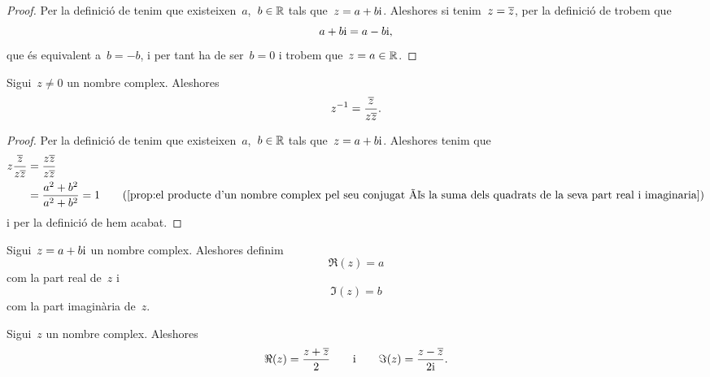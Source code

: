 \documentclass[../../main.tex]{subfiles}
\begin{document}
    \begin{proof}
        Per la definició de  tenim que
        existeixen~\(a\),~\(b\in\mathbb{R}\) tals que~\(z = a+b\mathrm{i}\).
        Aleshores si tenim~\(z = \overline{z}\), per la definició
        de  trobem que
        \[
            a+b\mathrm{i} = a-b\mathrm{i},
        \]
        que és equivalent a~\(b = -b\), i per tant ha de ser~\(b = 0\) i
        trobem que~\(z = a\in\mathbb{R}\).
    \end{proof}
    \begin{proposition}
        \label{prop:inversa d'un nombre complex en funció del seu conjugat}
        Sigui~\(z \neq 0\) un nombre complex.
        Aleshores
        \[
            z^{-1} = \frac{\overline{z}}{z\overline{z}}.
        \]
    \end{proposition}
    \begin{proof}
        Per la definició de  tenim que
        existeixen~\(a\),~\(b\in\mathbb{R}\) tals que~\(z = a+b\mathrm{i}\).
        Aleshores tenim que
        \begin{align*}
            z\frac{\conjugat{z}}{z\conjugat{z}}
                &= \frac{z\conjugat{z}}{z\conjugat{z}} \\
                &= \frac{a^{2}+b^{2}}{a^{2}+b^{2}} = 1
                \tag{\ref{prop:el producte d'un nombre complex pel seu conjugat és la suma dels quadrats de la seva part real i imaginaria}}
        \end{align*}
        i per la definició de 
        hem acabat.
    \end{proof}
    \begin{definition}
        \label{def:part real i part imaginària d'un nombre complex}
        \label{def:part real d'un nombre complex}
        \label{def:part imaginària d'un nombre complex}
        Sigui~\(z = a+b\mathrm{i}\) un nombre complex.
        Aleshores definim
        \[
            \Re(z) = a
        \]
        com la part real de~\(z\) i
        \[
            \Im(z) = b
        \]
        com la part imaginària de~\(z\).
    \end{definition}
    \begin{proposition}
        \label{prop:fórmules per la part real i part imaginària d'un nombre complex}
        \label{prop:fórmula per la part real d'un nombre complex}
        \label{prop:fórmula per la part imaginària d'un nombre complex}
        Sigui~\(z\) un nombre complex.
        Aleshores
        \[
            \Re(z) = \frac{z+\overline{z}}{2}\qquad\text{i}\qquad\Im(z)
                   = \frac{z-\overline{z}}{2\mathrm{i}}.
        \]
    \end{proposition}
\end{document}
